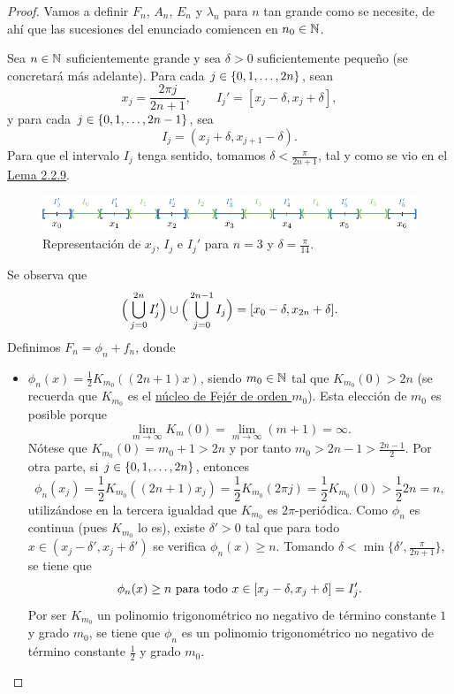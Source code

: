 \documentclass[a4paper, 12pt]{book}
\begin{document}
\begin{proof}
    Vamos a definir $F_n$, $A_n$, $E_n$ y $\lambda_n$ para $n$ tan grande como se necesite, de ahí que las sucesiones del enunciado comiencen en $n_0\in\mathbb N$.
    
    Sea $n \in \mathbb N$ suficientemente grande y sea $\delta > 0$ suficientemente pequeño (se concretará más adelante). Para cada $j \in \{0,1,\mathellipsis,2n\}$, sean
    \[x_j = \frac{2\pi j}{2n+1}, \qquad I_j' = [x_j-\delta,x_j+\delta],\]
    y para cada $j \in \{0,1,\mathellipsis,2n-1\}$, sea
    \[I_j = (x_j+\delta, x_{j+1}-\delta).\]
    Para que el intervalo $I_j$ tenga sentido, tomamos $\delta < \frac{\pi}{2n+1}$, tal y como se vio en el \hyperref[2.2.9]{Lema 2.2.9}.
    \begin{figure}[H]
      \centering
      \includegraphics{./plot16/main.pdf}
      \caption{Representación de $x_j$, $I_j$ e $I_j'$ para $n = 3$ y $\delta = \frac{\pi}{14}$.}
    \end{figure}
    \noindent Se observa que
    \[\Bigl(\,\bigcup_{j=0}^{2n}I_j'\Bigr) \cup\Bigl(\,\bigcup_{j=0}^{2n-1}I_j\Bigr) = [x_0-\delta,x_{2n}+\delta].\]
    Definimos $F_n = \phi_n+f_n$, donde
    \begin{itemize}
        \item $\phi_n(x) = \frac{1}{2}K_{m_0}((2n+1)x)$, siendo $m_0 \in \mathbb N$ tal que $K_{m_0}(0) > 2n$ (se recuerda que $K_{m_0}$ es el \hyperref[1.2.5]{núcleo de Fejér de orden $m_0$}). Esta elección de $m_0$ es posible porque \[\lim_{m \to \infty} K_m(0) = \lim_{m \to \infty} (m+1) = \infty.\]
        Nótese que $K_{m_0}(0)=m_0+1 > 2n$ y por tanto $m_0 > 2n-1> \frac{2n-1}{2}$. Por otra parte, si $j \in \{0,1,\mathellipsis,2n\}$, entonces
        \[\phi_n(x_j) = \frac{1}{2}K_{m_0}((2n+1)x_j) = \frac{1}{2}K_{m_0}(2\pi j) = \frac{1}{2}K_{m_0}(0) > \frac{1}{2}2n = n,\] 
        utilizándose en la tercera igualdad que $K_{m_0}$ es $2\pi$-periódica. Como $\phi_n$ es continua (pues $K_{m_0}$ lo es), existe $\delta' > 0$ tal que para todo $x \in (x_j-\delta',x_j+\delta')$ se verifica $\phi_n(x) \geq n$. Tomando $\delta < \min\{\delta',\frac{\pi}{2n+1}\}$, se tiene que
        \begin{equation}\label{2.2.13}
            \phi_n(x) \geq n \textup{ para todo } x \in [x_j-\delta,x_j+\delta] = I_j'.
        \end{equation}
        Por ser $K_{m_0}$ un polinomio trigonométrico no negativo de término constante $1$ y grado $m_0$, se tiene que $\phi_n$ es un polinomio trigonométrico no negativo de término constante $\frac{1}{2}$ y grado $m_0$. 
        

\end{itemize}
\end{proof}
\end{document}
